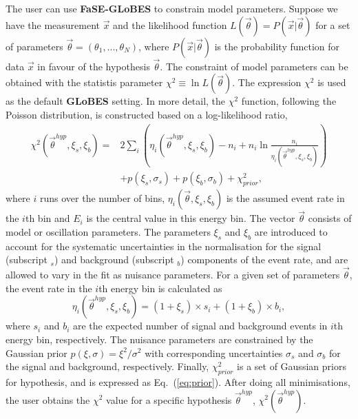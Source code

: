 \documentclass[aps,prd,nofootinbib,preprint]{revtex4}
\begin{document}
The user can use \textbf{FaSE-GLoBES} to constrain model parameters. 
Suppose we have the measurement $\vec{x}$ and the likelihood function $L(\vec{\theta})=P(\vec{x}|\vec{\theta})$ for a set of parameters $\vec{\theta}=(\theta_1,...,\theta_N)$, where $P(\vec{x}|\vec{\theta})$ is the probability function for data $\vec{x}$ in favour of the hypothesis $\vec{\theta}$. The constraint of model parameters can be obtained with the statistis parameter $\chi^2\equiv \ln L(\vec{\theta})$.
The expression $\chi^2$ is used as the default \textbf{GLoBES} setting. In more detail, the $\chi^2$ function, following the Poisson distribution, is constructed based on a log-likelihood ratio,
\begin{align}\label{eq:chi-squared}
\chi^2(\vec{\theta}^{hyp},\xi_s,\xi_b)=&2\sum_i\left(\eta_i(\vec{\theta}^{hyp},\xi_s,\xi_b)-n_i+n_i\ln\frac{n_i}{\eta_i(\vec{\theta}^{hyp},\xi_s,\xi_b)} \right)\nonumber\\
&+p(\xi_s,\sigma_s)+p(\xi_b,\sigma_b)+\chi^2_{prior},
\end{align}
where $i$ runs over the number of bins, $\eta_i(\vec{\theta},\xi_s,\xi_b)$ is the assumed event rate in the $i$th bin and $E_i$ is the central value in this energy bin. The vector $\vec{\theta}$ consists of model or oscillation parameters. The parameters $\xi_s$ and $\xi_b$ are introduced to account for the systematic uncertainties in the normalisation for the signal (subscript $_s$) and background (subscript $_b$) components of the event rate, and are allowed to vary in the fit as nuisance parameters. For a given set of parameters $\vec{\theta}$, the event rate in the $i$th energy bin is calculated as\\
\begin{equation}
\eta_i(\vec{\theta}^{hyp},\xi_s,\xi_b)=(1+\xi_s)\times s_i+(1+\xi_b)\times b_i,
\end{equation}
where $s_i$ and $b_i$ are the expected number of signal and background events in $i$th energy bin, respectively. The nuisance parameters are constrained by the Gaussian prior $p(\xi,\sigma)=\xi^2/\sigma^2$ with corresponding uncertainties $\sigma_s$ and $\sigma_b$ for the signal and background, respectively. Finally, $\chi^2_{prior}$ is a set of Gaussian priors for hypothesis, and is expressed as Eq.~(\ref{eq:prior}). After doing all minimisations, the user obtains the $\chi^2$ value for a specific hypothesis $\vec{\theta}^{hyp}$, $\chi^2(\vec{\theta}^{hyp})$.
\end{document}
